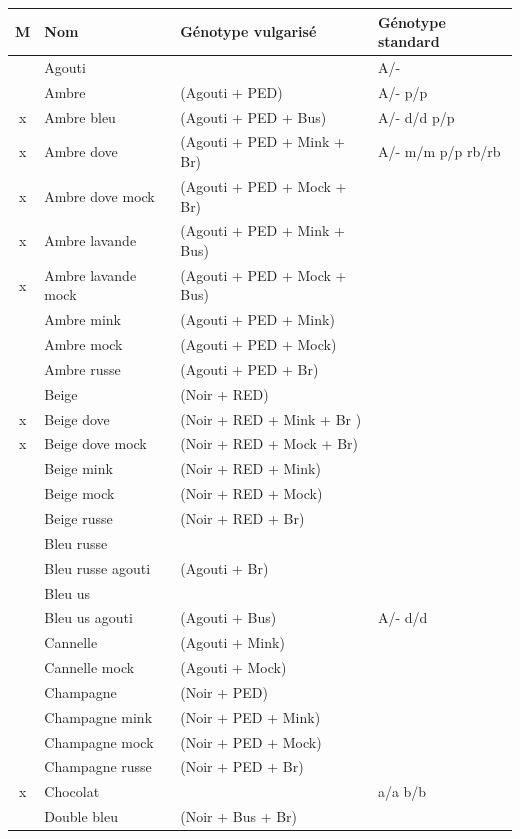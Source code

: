 \documentclass[a4paper,10pt]{article}
\begin{document}
\begin{longtable}{|c|l|l|l|}\hline
\textbf{M} & \textbf{Nom} & \textbf{Génotype vulgarisé} & \textbf{Génotype standard} \\\hline
\endhead
& Agouti & & A/- \\\hline
& Ambre & (Agouti + PED) & A/- p/p \\\hline
x & Ambre bleu  & (Agouti + PED + Bus) & A/- d/d p/p \\\hline
x & Ambre dove & (Agouti + PED + Mink + Br) & A/- m/m p/p rb/rb \\\hline
x & Ambre dove mock  & (Agouti + PED + Mock + Br) & \\\hline
x & Ambre lavande & (Agouti + PED + Mink + Bus) & \\\hline
x & Ambre lavande mock & (Agouti + PED + Mock   + Bus) & \\\hline
& Ambre mink &  (Agouti + PED + Mink) & \\\hline
& Ambre mock & (Agouti + PED + Mock) & \\\hline
& Ambre russe & (Agouti + PED + Br) & \\\hline
& Beige & (Noir + RED) & \\\hline
x & Beige dove & (Noir   + RED + Mink + Br )  & \\\hline
x & Beige dove mock  & (Noir + RED + Mock + Br) & \\\hline
& Beige mink  & (Noir   + RED + Mink) & \\\hline
& Beige mock  & (Noir + RED + Mock) & \\\hline
& Beige russe  & (Noir + RED + Br) & \\\hline
& Bleu russe & & \\\hline
& Bleu russe agouti  & (Agouti + Br) & \\\hline
& Bleu us & & \\\hline
& Bleu us agouti  & (Agouti + Bus) &  A/- d/d\\\hline
& Cannelle  & (Agouti + Mink) & \\\hline
& Cannelle mock  & (Agouti + Mock) & \\\hline
& Champagne  & (Noir + PED) & \\\hline
& Champagne mink  & (Noir + PED + Mink) & \\\hline
& Champagne mock  & (Noir + PED + Mock) & \\\hline
& Champagne russe  & (Noir + PED + Br) & \\\hline
x & Chocolat & & a/a b/b\\\hline
& Double bleu  & (Noir + Bus + Br) & \\\hline

\end{longtable}
\end{document}

